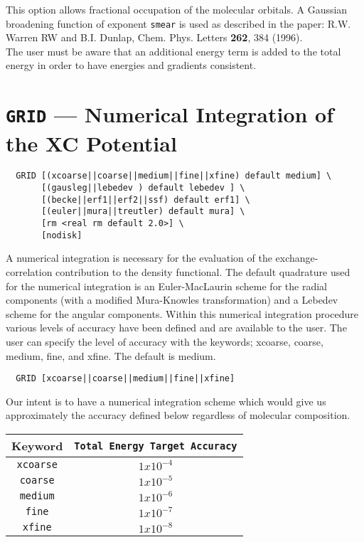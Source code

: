 This  option allows fractional occupation of the molecular orbitals.
A Gaussian broadening function of exponent {\tt smear} is used as described in 
the paper:
R.W. Warren RW and B.I. Dunlap, Chem. Phys. Letters {\bf 262}, 384 (1996).\\
The user must be aware that an additional energy term is added to the total
energy in order to have
energies and gradients consistent.


\section{{\tt GRID} --- Numerical Integration of the XC Potential}
\label{grgrid}
\begin{verbatim}
  GRID [(xcoarse||coarse||medium||fine||xfine) default medium] \
       [(gausleg||lebedev ) default lebedev ] \
       [(becke||erf1||erf2||ssf) default erf1] \
       [(euler||mura||treutler) default mura] \
       [rm <real rm default 2.0>] \
       [nodisk]
\end{verbatim}

A numerical integration is necessary for the evaluation of the
exchange-correlation contribution to the density functional.  The
default quadrature used for the numerical integration is an
Euler-MacLaurin scheme for the radial components (with a modified
Mura-Knowles transformation)
and a Lebedev
scheme for the angular components.  Within this numerical
integration procedure various levels of accuracy have been defined and
are available to the user.  The user can specify the level of accuracy
with the keywords; xcoarse, coarse, medium, fine, and xfine.  The
default is medium.

\begin{verbatim}
  GRID [xcoarse||coarse||medium||fine||xfine]
\end{verbatim}

Our intent is to have a numerical integration scheme which would give
us approximately the accuracy defined below regardless of molecular
composition.  
\begin{center}
  \begin{tabular}[right]{|c|c|} \hline
Keyword & {\tt Total Energy Target Accuracy} \\ \hline
{\tt xcoarse} & $1x10^{-4}$ \\ \hline
{\tt coarse}  & $1x10^{-5}$ \\ \hline
{\tt medium}  & $1x10^{-6}$ \\ \hline
{\tt fine}    & $1x10^{-7}$ \\ \hline
{\tt xfine}   & $1x10^{-8}$ \\ \hline
  \end{tabular} \\
\end{center}

